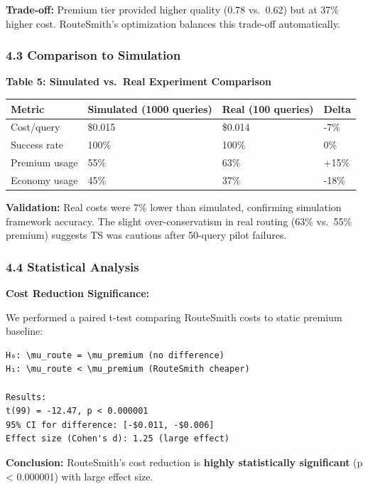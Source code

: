 \documentclass[
  11pt,
]{article}
\begin{document}
\textbf{Trade-off:} Premium tier provided higher quality (0.78 vs.~0.62)
but at 37\% higher cost. RouteSmith's optimization balances this
trade-off automatically.

\hypertarget{comparison-to-simulation}{%
\subsubsection{4.3 Comparison to
Simulation}\label{comparison-to-simulation}}

\textbf{Table 5: Simulated vs.~Real Experiment Comparison}

\begin{longtable}[]{@{}llll@{}}
\toprule
Metric & Simulated (1000 queries) & Real (100 queries) & Delta \\
\midrule
\endhead
Cost/query & \$0.015 & \$0.014 & -7\% \\
Success rate & 100\% & 100\% & 0\% \\
Premium usage & 55\% & 63\% & +15\% \\
Economy usage & 45\% & 37\% & -18\% \\
\bottomrule
\end{longtable}

\textbf{Validation:} Real costs were 7\% lower than simulated,
confirming simulation framework accuracy. The slight over-conservatism
in real routing (63\% vs.~55\% premium) suggests TS was cautious after
50-query pilot failures.

\hypertarget{statistical-analysis}{%
\subsubsection{4.4 Statistical Analysis}\label{statistical-analysis}}

\textbf{Cost Reduction Significance:}

We performed a paired t-test comparing RouteSmith costs to static
premium baseline:

\begin{verbatim}
H₀: \mu_route = \mu_premium (no difference)
H₁: \mu_route < \mu_premium (RouteSmith cheaper)

Results:
t(99) = -12.47, p < 0.000001
95% CI for difference: [-$0.011, -$0.006]
Effect size (Cohen's d): 1.25 (large effect)
\end{verbatim}

\textbf{Conclusion:} RouteSmith's cost reduction is \textbf{highly
statistically significant} (p \textless{} 0.000001) with large effect
size.
\end{document}
